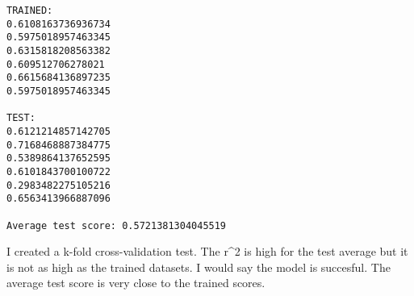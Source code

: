 \documentclass[11pt]{article}
\begin{document}
    \begin{Verbatim}[commandchars=\\\{\}]
TRAINED:
0.6108163736936734
0.5975018957463345
0.6315818208563382
0.609512706278021
0.6615684136897235
0.5975018957463345

TEST:
0.6121214857142705
0.7168468887384775
0.5389864137652595
0.6101843700100722
0.2983482275105216
0.6563413966887096

Average test score: 0.5721381304045519

    \end{Verbatim}

    I created a k-fold cross-validation test. The r\^{}2 is high for the
test average but it is not as high as the trained datasets. I would say
the model is succesful. The average test score is very close to the
trained scores.
\end{document}
